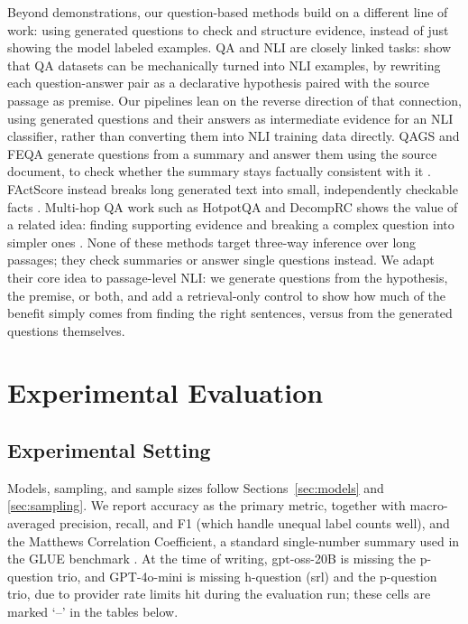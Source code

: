 \documentclass[11pt]{article}
\begin{document}
Beyond demonstrations, our question-based methods build on a different line
of work: using generated questions to check and structure evidence, instead
of just showing the model labeled examples. QA and NLI are closely linked
tasks: \citet{demszky2018transforming} show that QA datasets can be
mechanically turned into NLI examples, by rewriting each question-answer
pair as a declarative hypothesis paired with the source passage as premise.
Our pipelines lean on the reverse direction of that connection, using
generated questions and their answers as intermediate evidence for an NLI
classifier, rather than converting them into NLI training data directly.
QAGS and FEQA generate questions
from a summary and answer them using the source document, to check whether
the summary stays factually consistent with it
\citep{wang-etal-2020-asking,durmus-etal-2020-feqa}. FActScore instead breaks
long generated text into small, independently checkable facts
\citep{min-etal-2023-factscore}. Multi-hop QA work such as HotpotQA and
DecompRC shows the value of a related idea: finding supporting evidence and
breaking a complex question into simpler ones
\citep{yang-etal-2018-hotpotqa,min-etal-2019-multi}. None of these methods
target three-way inference over long passages; they check summaries or
answer single questions instead. We adapt their core idea to passage-level
NLI: we generate questions from the hypothesis, the premise, or both, and
add a retrieval-only control to show how much of the benefit simply comes
from finding the right sentences, versus from the generated questions
themselves.



\section{Experimental Evaluation}

\subsection{Experimental Setting}
\label{sec:setting}

Models, sampling, and sample sizes follow Sections~\ref{sec:models} and
\ref{sec:sampling}. We report accuracy as the primary metric, together with
macro-averaged precision, recall, and F1 (which handle unequal label counts
well), and the Matthews Correlation Coefficient, a standard single-number
summary used in the GLUE benchmark \citep{wang2018glue}. At the time of
writing, gpt-oss-20B is missing the p-question trio, and GPT-4o-mini is
missing h-question (srl) and the p-question trio, due to provider rate
limits hit during the evaluation run; these cells are marked `--' in the
tables below.
\end{document}
